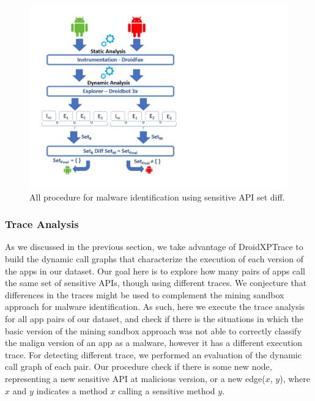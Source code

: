 
\begin{figure}[ht]
\centering
\includegraphics[scale=0.4]{images/sensitiveAPIdiff.pdf}
\caption{All procedure for malware identification using sensitive API set diff.}
 \label{fig:sensitiveAPI}
\end{figure}




\subsubsection{Trace Analysis} \label{sec:pathsetup}


As we discussed in the previous section, we take advantage of DroidXPTrace to build the dynamic call graphs that characterize the execution of each version of the apps in our dataset. Our goal
here is to explore how many pairs of apps call the same set of sensitive APIs, though using different
traces. We conjecture that differences in the traces might be used to complement the mining sandbox
approach for malware identification. As such, here we execute the trace
analysis for all app pairs of our dataset, and check if there is the situations in which the basic version of the mining sandbox approach was not able to correctly classify the malign version of an app as a malware, however it has a different execution trace. For detecting different trace, we performed an evaluation of the dynamic call graph of each pair. Our procedure check if there is some new node, representing a new sensitive API at malicious version, or a new edge($x$, $y$), where $x$ and $y$ indicates a method $x$ calling a sensitive method $y$.

